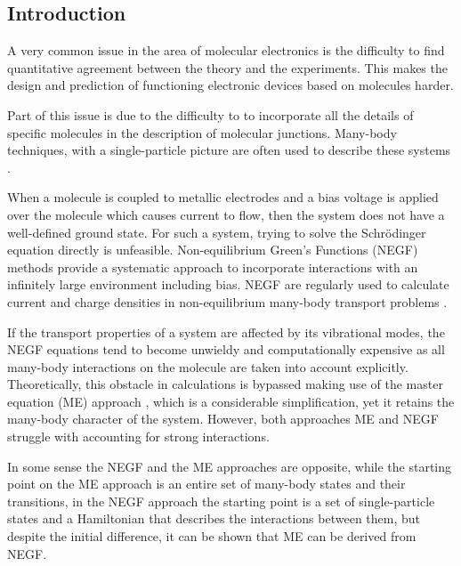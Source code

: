 \documentclass{article}
\begin{document}
\begin{multicols}{2}
        
    \section{Introduction}
        A very common issue in the area of molecular electronics is the difficulty to find quantitative agreement between the theory and the experiments. This makes the design and prediction of functioning electronic devices based on molecules harder.
        
        Part of this issue is due to the difficulty to to incorporate all the details of specific molecules in the description of molecular junctions. Many-body techniques, with a single-particle picture are often used to describe these systems \cite{Tsuneda2014}. 
        
        When a molecule is coupled to metallic electrodes and a bias voltage is applied over the molecule which causes current to flow, then the system does not have a well-defined ground state. For such a system, trying to solve the Schr\"odinger equation directly is unfeasible. Non-equilibrium Green's Functions (NEGF) methods provide a systematic approach to incorporate interactions with an infinitely large environment including bias. NEGF are regularly used to calculate current and charge densities in non-equilibrium many-body transport problems \cite{Mattuck1976, Jauho1994, haugjauho, Datta1997}. 
         
                
        If the transport properties of a system are affected by its vibrational modes, the NEGF equations tend to become unwieldy and computationally expensive as all many-body interactions on the molecule are taken into account explicitly. Theoretically, this obstacle in calculations is bypassed making use of the master equation (ME) approach \cite{beenakker}, which is a considerable simplification, yet it retains the many-body character of the system. However, both approaches ME and NEGF struggle with accounting for strong interactions.
        
        In some sense the NEGF and the ME approaches are opposite, while the starting point on the ME approach is an entire set of many-body states and their transitions, in the NEGF approach the starting point is a set of single-particle states and a Hamiltonian that describes the interactions between them, but despite the initial difference, it can be shown that ME can be derived from NEGF.
            

\end{multicols}
\end{document}
